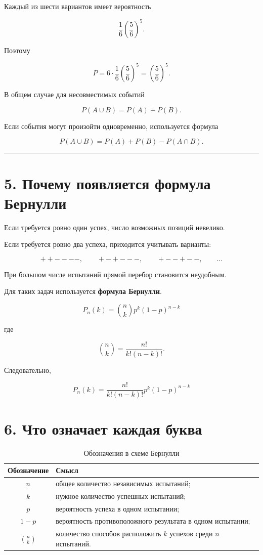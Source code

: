 \documentclass[a4paper,12pt]{article}
\newcommand{\accentline}{%
    \par\noindent
    {\color{accent}\rule{\linewidth}{0.7pt}}
    \par
}
\newcommand{\key}[1]{\textbf{\color{darkaccent}#1}}
\begin{document}
Каждый из шести вариантов имеет вероятность

\[
\frac16\left(\frac56\right)^5.
\]

Поэтому

\[
P=
6\cdot
\frac16
\left(\frac56\right)^5
=
\left(\frac56\right)^5.
\]

\medskip

В общем случае для несовместимых событий

\[
P(A\cup B)=P(A)+P(B).
\]

Если события могут произойти одновременно, используется формула

\[
P(A\cup B)
=
P(A)+P(B)-P(A\cap B).
\]

\accentline

\section*{\color{darkaccent}5. Почему появляется формула Бернулли}

Если требуется ровно один успех, число возможных позиций невелико.

Если требуется ровно два успеха, приходится учитывать варианты:

\[
++----,\qquad +-+---,\qquad +--+--,\qquad \ldots
\]

При большом числе испытаний прямой перебор становится неудобным.

Для таких задач используется \key{формула Бернулли}.

\[
\boxed{
P_n(k)
=
\binom{n}{k}
p^k(1-p)^{n-k}
}
\]

где

\[
\binom{n}{k}
=
\frac{n!}{k!(n-k)!}.
\]

Следовательно,

\[
\boxed{
P_n(k)
=
\frac{n!}{k!(n-k)!}
p^k(1-p)^{n-k}
}
\]

\section*{\color{darkaccent}6. Что означает каждая буква}

\renewcommand{\arraystretch}{1.35}

\begin{table}[h!]
\centering
\caption{Обозначения в схеме Бернулли}
\begin{tabularx}{\linewidth}{@{}cX@{}}
\toprule
\textbf{Обозначение} & \textbf{Смысл} \\
\midrule
$n$ & общее количество независимых испытаний; \\
$k$ & нужное количество успешных испытаний; \\
$p$ & вероятность успеха в одном испытании; \\
$1-p$ & вероятность противоположного результата в одном испытании; \\
$\binom{n}{k}$ & количество способов расположить $k$ успехов среди $n$ испытаний. \\
\bottomrule
\end{tabularx}
\end{table}
\end{document}
